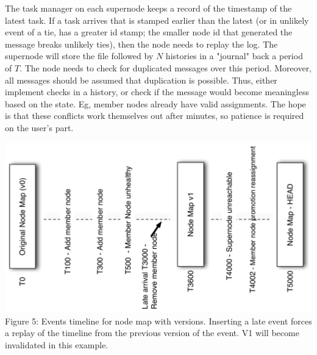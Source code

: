 \documentclass[oneside,12pt]{memoir}
\begin{document}
  The task manager on each supernode keeps a record of the timestamp of the latest task.  If a task arrives that is stamped earlier than the latest (or in unlikely event of a tie, has a greater id stamp; the smaller node id that generated the message breaks unlikely ties), then the node needs to replay the log. 
  The supernode will store the file followed by $N$ histories in a "journal" back a period of $T$.  
    The node needs to check for duplicated messages over this period.  Moreover, all messages should be assumed that duplication is possible.  Thus, either implement checks in a history, or check if the message would become meaningless based on the state.  Eg, member nodes already have valid assignments.   The hope is that these conflicts work themselves out after minutes, so patience is required on the user's part. \\
\begin{center}
\includegraphics[width=\textwidth]{presentation/timeline.pdf}
Figure 5: Events timeline for node map with versions.  Inserting a late event forces a replay of the timeline from the previous version of the event.  V1 will become invalidated in this example. 
\end{center}
\end{document}
